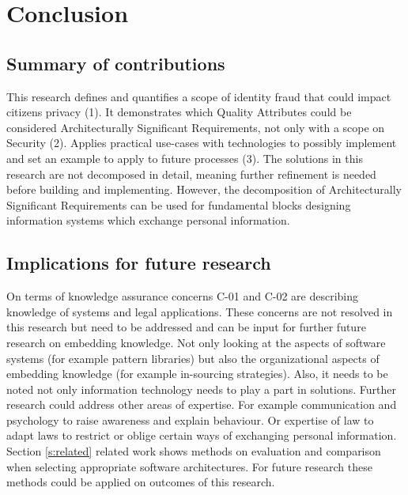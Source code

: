 \chapter{Conclusion}\label{s:conclusion}
\section{Summary of contributions}
This research defines and quantifies a scope of identity fraud that could impact citizens privacy (1). It demonstrates which Quality Attributes could be considered Architecturally Significant Requirements, not only with a scope on Security (2). Applies practical use-cases with technologies to possibly implement and set an example to apply to future processes (3). The solutions in this research are not decomposed in detail, meaning further refinement is needed before building and implementing. However, the decomposition of Architecturally Significant Requirements can be used for fundamental blocks designing information systems which exchange personal information. 

\section{Implications for future research}\label{Implications}
On terms of knowledge assurance concerns C-01 and C-02 are describing knowledge of systems and legal applications. These concerns are not resolved in this research but need to be addressed and can be input for further future research on embedding knowledge. Not only looking at the aspects of software systems (for example pattern libraries) but also the organizational aspects of embedding knowledge (for example in-sourcing strategies). 
Also, it needs to be noted not only information technology needs to play a part in solutions. Further research could address other areas of expertise. For example communication and psychology to raise awareness and explain behaviour. Or expertise of law to adapt laws to restrict or oblige certain ways of exchanging personal information. 
Section \ref{s:related} related work shows methods on evaluation and comparison when selecting appropriate software architectures. For future research these methods could be applied on outcomes of this research.

